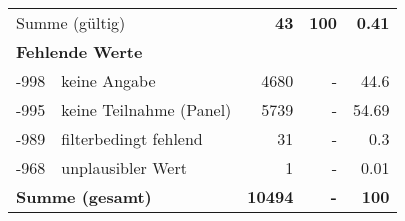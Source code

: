 \begin{longtable}{lXrrr}
     \midrule
     \multicolumn{2}{l}{Summe (gültig)} &
       \textbf{\num{43}} &
     \textbf{\num{100}} &
       \textbf{\num[round-mode=places,round-precision=2]{0.41}} \\
     \multicolumn{5}{l}{\textbf{Fehlende Werte}}\\
       -998 &
       keine Angabe &
         \num{4680} &
        - &
         \num[round-mode=places,round-precision=2]{44.6} \\
       -995 &
       keine Teilnahme (Panel) &
         \num{5739} &
        - &
         \num[round-mode=places,round-precision=2]{54.69} \\
       -989 &
       filterbedingt fehlend &
         \num{31} &
        - &
         \num[round-mode=places,round-precision=2]{0.3} \\
       -968 &
       unplausibler Wert &
         \num{1} &
        - &
         \num[round-mode=places,round-precision=2]{0.01} \\
     \midrule
     \multicolumn{2}{l}{\textbf{Summe (gesamt)}} &
          \textbf{\num{10494}} &
        \textbf{-} &
        \textbf{\num{100}} \\
     \bottomrule
     \end{longtable}
     
